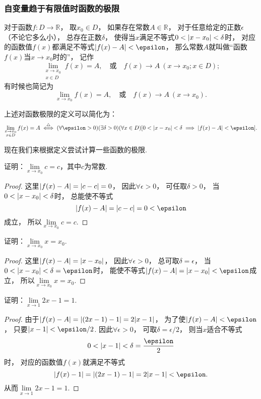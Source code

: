 \subsubsection*{自变量趋于有限值时函数的极限}
\begin{definition}\label{definition:极限.函数极限的定义1}
对于函数\(f\colon D\to\mathbb{R}\)，
取\(x_0 \in D\)，
如果存在常数\(A\in\mathbb{R}\)，
对于任意给定的正数\(\epsilon\)（不论它多么小），
总存在正数\(\delta\)，
使得当\(x\)满足不等式\(0 < \abs{x-x_0} < \delta\)时，
对应的函数值\(f(x)\)都满足不等式\(\abs{f(x)-A}<\epsilon\)，
那么常数\(A\)就叫做“函数\(f(x)\)当\(x \to x_0\)时的”，
记作
\[
	\lim\limits_{\substack{x \to x_0 \\ x \in D}} f(x) = A,
	\quad\text{或}\quad
	f(x) \to A\ (x \to x_0; x \in D);
\]
有时候也简记为
\[
	\lim\limits_{x \to x_0} f(x) = A,
	\quad\text{或}\quad
	f(x) \to A\ (x \to x_0).
\]
\end{definition}

上述对函数极限的定义可以简化为：
\[
	\lim\limits_{\substack{x \to x_0 \\ x \in D}} f(x) = A
	\defiff
	(\forall \epsilon > 0)
	(\exists \delta > 0)
	(\forall x \in D)
	[0 < \abs{x - x_0} < \delta \implies \abs{f(x) - A} < \epsilon].
\]

现在我们来根据定义尝试计算一些函数的极限.
\begin{example}
证明：\(\lim\limits_{x \to x_0} c = c\)，其中\(c\)为常数.
\begin{proof}
这里\(\abs{f(x) - A} = \abs{c - c} = 0\)，
因此\(\forall \epsilon > 0\)，
可任取\(\delta > 0\)，
当\(0 < \abs{x - x_0} < \delta\)时，
总能使不等式\[
	\abs{f(x) - A} = \abs{c - c} = 0 < \epsilon
\]成立，
所以\(\lim\limits_{x \to x_0} c = c\).
\end{proof}
\end{example}

\begin{example}
证明：\(\lim\limits_{x \to x_0} x = x_0\).
\begin{proof}
这里\(\abs{f(x) - A} = \abs{x - x_0}\)，
因此\(\forall \epsilon > 0\)，
总可取\(\delta = \epsilon\)，
当\(0 < \abs{x - x_0} < \delta = \epsilon\)时，
能使不等式\(\abs{f(x) - A} = \abs{x - x_0} < \epsilon\)成立，
所以\(\lim\limits_{x \to x_0} x = x_0\).
\end{proof}
\end{example}

\begin{example}
证明：\(\lim\limits_{x\to1} 2x-1 = 1\).
\begin{proof}
由于\(\abs{f(x) - A} = \abs{(2x-1) - 1} = 2\abs{x-1}\)，
为了使\(\abs{f(x) - A} < \epsilon\)，
只要\(\abs{x-1}<\epsilon/2\).
因此\(\forall \epsilon > 0\)，
可取\(\delta = \epsilon/2\)，
则当\(x\)适合不等式\[
	0 < \abs{x-1} < \delta = \frac{\epsilon}{2}
\]时，
对应的函数值\(f(x)\)就满足不等式\[
	\abs{f(x) - 1} = \abs{(2x-1) - 1} = 2\abs{x-1} < \epsilon.
\]
从而\(\lim\limits_{x\to1} 2x-1 = 1\).
\end{proof}
\end{example}

